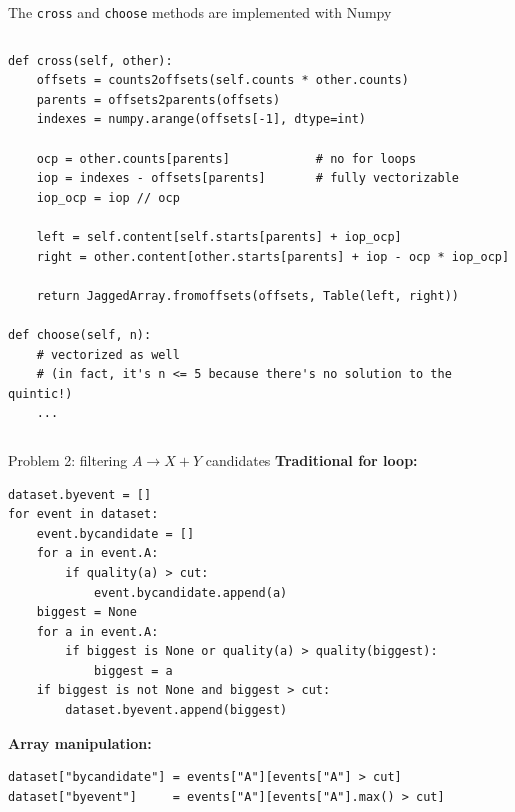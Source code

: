 \documentclass[aspectratio=169]{beamer}
\begin{document}
\begin{frame}[fragile]{The {\tt cross} and {\tt choose} methods are implemented with Numpy}
\begin{columns}
\small
\begin{verbatim}
def cross(self, other):
    offsets = counts2offsets(self.counts * other.counts)
    parents = offsets2parents(offsets)
    indexes = numpy.arange(offsets[-1], dtype=int)

    ocp = other.counts[parents]            # no for loops
    iop = indexes - offsets[parents]       # fully vectorizable
    iop_ocp = iop // ocp

    left = self.content[self.starts[parents] + iop_ocp]
    right = other.content[other.starts[parents] + iop - ocp * iop_ocp]

    return JaggedArray.fromoffsets(offsets, Table(left, right))

def choose(self, n):
    # vectorized as well
    # (in fact, it's n <= 5 because there's no solution to the quintic!)
    ...
\end{verbatim}
\end{columns}
\end{frame}

\begin{frame}[fragile]{Problem 2: filtering $A \to X + Y$ candidates}
\vspace{0.4 cm}
{\bf Traditional for loop:} 
\small
\begin{verbatim}
dataset.byevent = []
for event in dataset:
    event.bycandidate = []
    for a in event.A:
        if quality(a) > cut:
            event.bycandidate.append(a)
    biggest = None
    for a in event.A:
        if biggest is None or quality(a) > quality(biggest):
            biggest = a
    if biggest is not None and biggest > cut:
        dataset.byevent.append(biggest)
\end{verbatim}
\normalsize

\vspace{0.1 cm}
{\bf Array manipulation:} 
\small
\begin{verbatim}
dataset["bycandidate"] = events["A"][events["A"] > cut]
dataset["byevent"]     = events["A"][events["A"].max() > cut]
\end{verbatim}
\end{frame}
\end{document}
